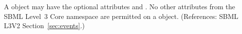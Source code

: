 A \Priority object may have the optional attributes   and
.  No other attributes from the SBML Level~3 Core namespace
are permitted on a \Priority object.  (References: SBML L3V2
Section~\ref{sec:events}.)
